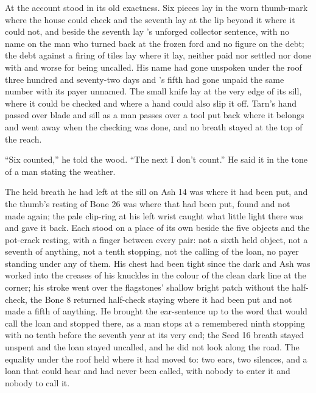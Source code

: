 At  the account stood in its old exactness. Six pieces lay in the worn thumb-mark where the house could check and the seventh lay at the lip beyond it where it could not, and beside the seventh lay 's unforged collector sentence, with no name on the man who turned back at the frozen ford and no figure on the debt; the debt against a firing of tiles lay where it lay, neither paid nor settled nor done with and worse for being uncalled. His name had gone unspoken under the roof three hundred and seventy-two days and 's fifth had gone unpaid the same number with its payer unnamed. The small knife lay at the very edge of its sill, where it could be checked and where a hand could also slip it off. Tarn's hand passed over blade and sill as a man passes over a tool put back where it belongs and went away when the checking was done, and no breath stayed at the top of the reach.

“Six counted,” he told the wood. “The next I don't count.” He said it in the tone of a man stating the weather.

The held breath he had left at the sill on Ash 14 was where it had been put, and the thumb's resting of Bone 26 was where that had been put, found and not made again; the pale clip-ring at his left wrist caught what little light there was and gave it back. Each stood on a place of its own beside the five objects and the pot-crack resting, with a finger between every pair: not a sixth held object, not a seventh of anything, not a tenth stopping, not the calling of the loan, no payer standing under any of them. His chest had been tight since the dark and Ash was worked into the creases of his knuckles in the colour of the clean dark line at the corner; his stroke went over the flagstones' shallow bright patch without the half-check, the Bone 8 returned half-check staying where it had been put and not made a fifth of anything. He brought the ear-sentence up to the word that would call the loan and stopped there, as a man stops at a remembered ninth stopping with no tenth before the seventh year at its very end; the Seed 16 breath stayed unspent and the loan stayed uncalled, and he did not look along the road. The equality under the roof held where it had moved to: two ears, two silences, and a loan that could hear and had never been called, with nobody to enter it and nobody to call it.

\scenebreak

